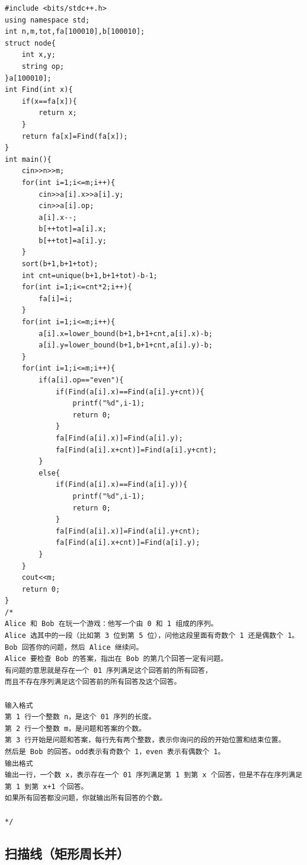 \documentclass[11pt,a4paper]{ctexart}
\begin{document}
\begin{lstlisting}
#include <bits/stdc++.h>
using namespace std;
int n,m,tot,fa[100010],b[100010];
struct node{
	int x,y;
	string op;
}a[100010];
int Find(int x){
	if(x==fa[x]){
		return x;
	}
	return fa[x]=Find(fa[x]);
}
int main(){
	cin>>n>>m;
	for(int i=1;i<=m;i++){
		cin>>a[i].x>>a[i].y;
		cin>>a[i].op;
		a[i].x--;
		b[++tot]=a[i].x;
		b[++tot]=a[i].y;
	}
	sort(b+1,b+1+tot);
	int cnt=unique(b+1,b+1+tot)-b-1;
	for(int i=1;i<=cnt*2;i++){
		fa[i]=i;
	}
	for(int i=1;i<=m;i++){
		a[i].x=lower_bound(b+1,b+1+cnt,a[i].x)-b;
		a[i].y=lower_bound(b+1,b+1+cnt,a[i].y)-b;
	}
	for(int i=1;i<=m;i++){
		if(a[i].op=="even"){
			if(Find(a[i].x)==Find(a[i].y+cnt)){
				printf("%d",i-1);
				return 0;
			}
			fa[Find(a[i].x)]=Find(a[i].y);
			fa[Find(a[i].x+cnt)]=Find(a[i].y+cnt);
		}
		else{
			if(Find(a[i].x)==Find(a[i].y)){
				printf("%d",i-1);
				return 0;
			}
			fa[Find(a[i].x)]=Find(a[i].y+cnt);
			fa[Find(a[i].x+cnt)]=Find(a[i].y);
		}
	}
	cout<<m;
	return 0;
}
/*
Alice 和 Bob 在玩一个游戏：他写一个由 0 和 1 组成的序列。
Alice 选其中的一段（比如第 3 位到第 5 位），问他这段里面有奇数个 1 还是偶数个 1。
Bob 回答你的问题，然后 Alice 继续问。
Alice 要检查 Bob 的答案，指出在 Bob 的第几个回答一定有问题。
有问题的意思就是存在一个 01 序列满足这个回答前的所有回答，
而且不存在序列满足这个回答前的所有回答及这个回答。

输入格式
第 1 行一个整数 n，是这个 01 序列的长度。
第 2 行一个整数 m，是问题和答案的个数。
第 3 行开始是问题和答案，每行先有两个整数，表示你询问的段的开始位置和结束位置。
然后是 Bob 的回答。odd表示有奇数个 1，even 表示有偶数个 1。
输出格式
输出一行，一个数 x，表示存在一个 01 序列满足第 1 到第 x 个回答，但是不存在序列满足第 1 到第 x+1 个回答。
如果所有回答都没问题，你就输出所有回答的个数。

*/
\end{lstlisting}

\subsection{扫描线（矩形周长并）}
\end{document}
